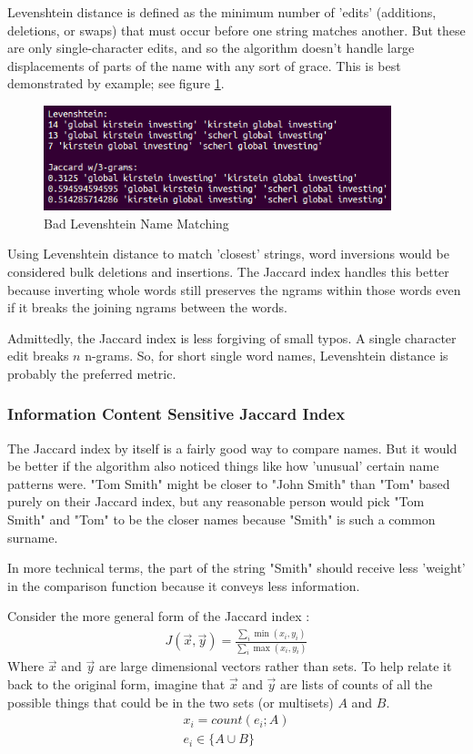 \documentclass[11pt]{article}
\begin{document}
Levenshtein distance is defined as \cite{levenshtein} the minimum number of 'edits' 
(additions, deletions, or swaps) that must occur before one string matches another.
But these are only single-character edits, and so the algorithm doesn't handle large displacements
of parts of the name with any sort of grace.
This is best demonstrated by example; see figure \ref{fig:lev_comp}.

\begin{figure}[h!]
    \centering
    \includegraphics[width=0.9\textwidth,natwidth=1,natheight=1]{imgs/levenshtein_comp.png}
    \caption{Bad Levenshtein Name Matching}
    \label{fig:lev_comp}
\end{figure}

Using Levenshtein distance to match 'closest' strings, word 
inversions would be considered bulk deletions and insertions. 
The Jaccard index handles this better because inverting whole words 
still preserves the ngrams within those words even if it breaks
the joining ngrams between the words.

Admittedly, the Jaccard index is less forgiving of small typos. 
A single character edit breaks $n$ n-grams. So, for short single
word names, Levenshtein distance is probably the preferred metric.

\subsubsection{Information Content Sensitive Jaccard Index}
The Jaccard index by itself is a fairly good way to compare names.
But it would be better if the algorithm also noticed things like
how 'unusual' certain name patterns were. 
"Tom Smith" might be closer to "John Smith" than "Tom" based purely
on their Jaccard index, but any reasonable person would pick
"Tom Smith" and "Tom" to be the closer names because "Smith" is
such a common surname.

In more technical terms, the part of the string "Smith"
should receive less 'weight' in the comparison function because
it conveys less information. 

Consider the more general form of the Jaccard index \cite{general}:
\begin{align*}
J(\vec{x},\vec{y}) = 
\frac{\sum_i \min(x_i, y_i)}{\sum_i \max(x_i, y_i)}
\end{align*}
Where $\vec{x}$ and $\vec{y}$ are large dimensional vectors rather 
than sets. To help relate it back to the original form, 
imagine that $\vec{x}$ and $\vec{y}$ are lists
of counts of all the possible things that could be in the two sets
(or multisets) $A$ and $B$.
\begin{align*}
x_i = count(e_i; A)\\
e_i \in \{A \cup B \}
\end{align*}
\end{document}
